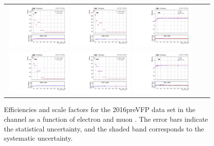 {\begin{figure}[h]
  \begin{center}
    \begin{tabular}{ccc}
      \includegraphics[width=0.32\textwidth]{fig_2016preVFP_TrigSF/g_lepApt_emu_MC.pdf}
      \includegraphics[width=0.32\textwidth]{fig_2016preVFP_TrigSF/g_lepApt_emu_data.pdf}
      \includegraphics[width=0.32\textwidth]{fig_2016preVFP_TrigSF/g_emu_lepApt_FullSystUncBand.pdf}\\
      \includegraphics[width=0.32\textwidth]{fig_2016preVFP_TrigSF/g_lepBpt_emu_MC.pdf}
      \includegraphics[width=0.32\textwidth]{fig_2016preVFP_TrigSF/g_lepBpt_emu_data.pdf}
      \includegraphics[width=0.32\textwidth]{fig_2016preVFP_TrigSF/g_emu_lepBpt_FullSystUncBand.pdf}\\
    \end{tabular}
    \caption{Efficiencies and scale factors for the 2016preVFP data set in the \emu channel as a function of electron and muon \pT.
            The error bars indicate the statistical uncertainty, and the shaded band corresponds to the systematic uncertainty.
            }
    \label{TrigSF_2016preVFP_1}
  \end{center}
\end{figure}

}
